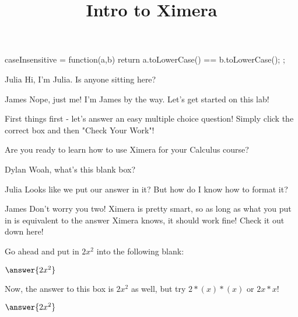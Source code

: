\documentclass{ximera}
\title{Intro to Ximera}
\begin{document}
\begin{javascript}
 caseInsensitive = function(a,b) {
    return a.toLowerCase() == b.toLowerCase();
  };
\end{javascript}

\begin{dialogue}
\item[Julia] Hi, I'm Julia. Is anyone sitting here?
\item{James} Nope, just me! I'm James by the way. Let's get started on this lab!
\end{dialogue}

First things first - let's answer an easy multiple choice question! Simply click the correct box and then "Check Your Work"!

\begin{question}
Are you ready to learn how to use Ximera for your Calculus course?

\begin{multipleChoice}
\choice{}
\choice{}
\choice[correct]{}
\choice{}
\end{multipleChoice}
\end{question}

\begin{dialogue}
\item[Dylan] Woah, what's this blank box?
\item[Julia] Looks like we put our answer in it? But how do I know how to format it?
\item[James] Don't worry you two! Ximera is pretty smart, so as long as what you put in is equivalent to the answer Ximera knows, it should work fine! Check it out down here!
\end{dialogue}

\begin{question}
Go ahead and put in $2x^2$ into the following blank:

$\answer{2x^2}$

Now, the answer to this box is $2x^2$ as well, but try $2*(x)*(x)$ or $2x*x$!

$\answer{2x^2}$
\end{question}
\end{document}
